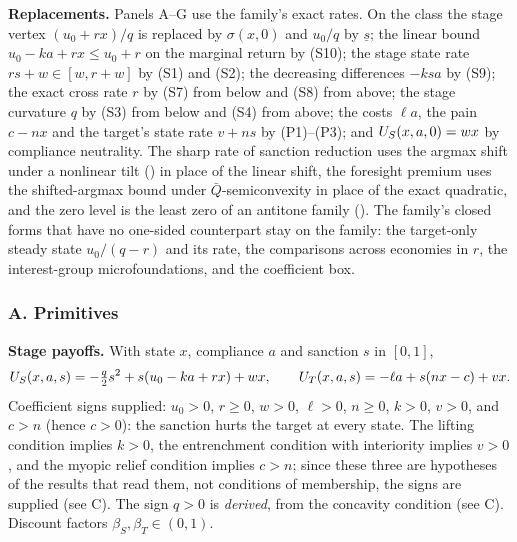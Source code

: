 \textbf{Replacements.} Panels A--G use the family's exact rates. On the class
the stage vertex $(u_0+rx)/q$ is replaced by $\sigma(x,0)$ and $u_0/q$
by $\underline s$; the linear bound $u_0-ka+rx\le u_0+r$ on the marginal return by (S10); the
stage state rate $rs+w\in[w,r+w]$ by (S1) and (S2); the decreasing differences
$-ksa$ by (S9); the exact cross rate $r$ by (S7) from below and (S8) from above;
the stage curvature $q$ by (S3) from below and (S4) from above; the costs $\ell a$,
the pain $c-nx$ and the target's state rate $v+ns$ by (P1)--(P3); and
$U_S(x,a,0)=wx$ by compliance neutrality. The sharp rate of sanction reduction uses the
argmax shift under a nonlinear tilt ()
in place of the linear shift, the foresight premium uses the shifted-argmax bound under
$\bar Q$-semiconvexity in place of the exact quadratic, and the zero level is
the least zero of an antitone family (). The
family's closed forms that have no one-sided counterpart stay on the family:
the target-only steady state $u_0/(q-r)$ and its rate, the comparisons across
economies in $r$, the interest-group microfoundations, and the coefficient box.

\subsubsection*{A. Primitives}

\textbf{Stage payoffs.} With state $x$, compliance $a$ and sanction $s$ in
$[0,1]$,
\[
U_S(x,a,s)=-\tfrac q2 s^2+s(u_0-ka+rx)+wx,
\qquad
U_T(x,a,s)=-\ell a+s(nx-c)+vx .
\]
Coefficient signs supplied: $u_0>0$, $r\ge0$, $w>0$, $\ell>0$, $n\ge0$, $k>0$,
$v>0$, and $c>n$ (hence $c>0$): the sanction hurts the target at every state.
The lifting condition implies $k>0$, the entrenchment condition with interiority implies $v>0$, and
the myopic relief condition implies $c>n$; since these three are hypotheses of the
results that read them, not conditions of membership, the signs are supplied
(see C). The sign $q>0$ is \emph{derived}, from the concavity condition (see C).
Discount factors
$\beta_S,\beta_T\in(0,1)$.

